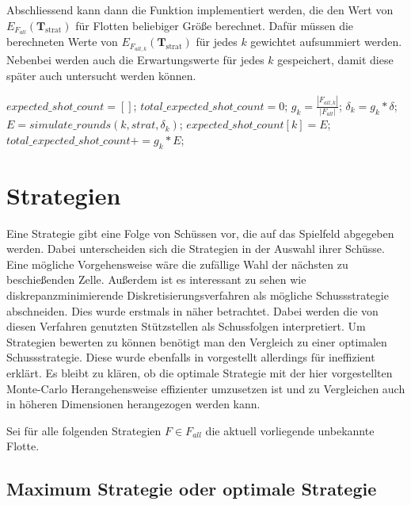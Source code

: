 \documentclass[a4paper,12pt]{llncs}
\numberwithin{equation}{section}
\DeclareMathOperator{\strat}{strat}
\begin{document}
Abschliessend kann dann die Funktion implementiert werden, die den Wert von $E_{F_{all}}(\mathbf{T}_{\strat})$ für Flotten beliebiger Größe berechnet. Dafür müssen die berechneten Werte von $E_{F_{all,k}}(\mathbf{T}_{\strat})$ für jedes $k$ gewichtet aufsummiert werden. Nebenbei werden auch die Erwartungswerte für jedes $k$ gespeichert, damit diese später auch untersucht werden können.

\begin{tcolorbox}
\begin{algorithmic}[H]
	\State $expected\_shot\_count=[]$;
	\State $total\_expected\_shot\_count=0$;
	\State $g_k=\frac{|F_{all,k}|}{|F_{all}|}$;
	\State $\delta_k=g_k * \delta$;
	\State $E=simulate\_rounds(k, strat, \delta_k)$;
	\State $expected\_shot\_count[k] = E$;
	\State $total\_expected\_shot\_count+=g_k * E$;
	\EndFor
	\EndFunction
\end{algorithmic}
\end{tcolorbox}


\section{Strategien}

Eine Strategie gibt eine Folge von Schüssen vor, die auf das Spielfeld abgegeben werden. Dabei unterscheiden sich die Strategien in der Auswahl ihrer Schüsse. Eine mögliche Vorgehensweise wäre die zufällige Wahl der nächsten zu beschießenden Zelle. Außerdem ist es interessant zu sehen wie diskrepanzminimierende Diskretisierungsverfahren als mögliche Schussstrategie abschneiden. Dies wurde erstmals in \cite{M13} näher betrachtet. Dabei werden die von diesen Verfahren genutzten Stützstellen als Schussfolgen interpretiert. Um Strategien bewerten zu können benötigt man den Vergleich zu einer optimalen Schussstrategie. Diese wurde ebenfalls in \cite{M13} vorgestellt allerdings für ineffizient erklärt. Es bleibt zu klären, ob die optimale Strategie mit der hier vorgestellten Monte-Carlo Herangehensweise effizienter umzusetzen ist und zu Vergleichen auch in höheren Dimensionen herangezogen werden kann.

Sei für alle folgenden Strategien $F\in F_{all}$ die aktuell vorliegende unbekannte Flotte.

\subsection{Maximum Strategie oder optimale Strategie}
\end{document}
